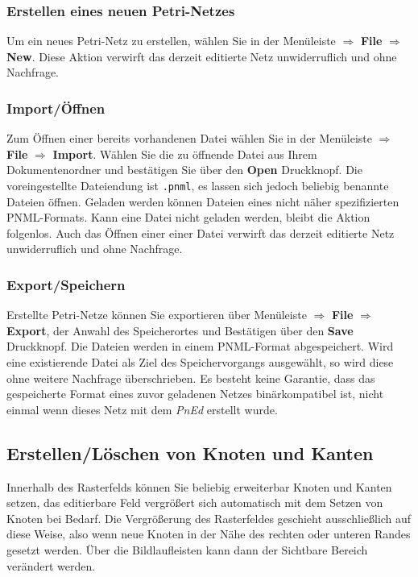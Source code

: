 \documentclass[11pt]{article}
\begin{document}
\subsubsection{Erstellen eines neuen Petri-Netzes}
\label{sec-2-1-1}

    Um ein neues Petri-Netz zu erstellen, wählen Sie in der Menüleiste
    $\Rightarrow$ \textbf{File} $\Rightarrow$ \textbf{New}.  Diese Aktion verwirft das
    derzeit editierte Netz unwiderruflich und ohne Nachfrage.
\subsubsection{Import/Öffnen}
\label{sec-2-1-2}

    Zum Öffnen einer bereits vorhandenen Datei wählen Sie in der
    Menüleiste $\Rightarrow$ \textbf{File} $\Rightarrow$ \textbf{Import}. Wählen Sie die
    zu öffnende Datei aus Ihrem Dokumentenordner und bestätigen Sie
    über den \textbf{Open} Druckknopf.  Die voreingestellte Dateiendung ist
    \verb|.pnml|, es lassen sich jedoch beliebig benannte Dateien
    öffnen.  Geladen werden können Dateien eines nicht näher
    spezifizierten PNML-Formats.  Kann eine Datei nicht geladen
    werden, bleibt die Aktion folgenlos.  Auch das Öffnen einer einer
    Datei verwirft das derzeit editierte Netz unwiderruflich und ohne
    Nachfrage.
\subsubsection{Export/Speichern}
\label{sec-2-1-3}

    Erstellte Petri-Netze können Sie exportieren über Menüleiste
    $\Rightarrow$ \textbf{File} $\Rightarrow$ \textbf{Export}, der Anwahl des
    Speicherortes und Bestätigen über den \textbf{Save} Druckknopf. Die
    Dateien werden in einem PNML-Format abgespeichert.  Wird eine
    existierende Datei als Ziel des Speichervorgangs ausgewählt, so
    wird diese ohne weitere Nachfrage überschrieben.  Es besteht keine
    Garantie, dass das gespeicherte Format eines zuvor geladenen
    Netzes binärkompatibel ist, nicht einmal wenn dieses Netz mit dem
    \emph{PnEd} erstellt wurde.
\subsection{Erstellen/Löschen von Knoten und Kanten}
\label{sec-2-2}


   Innerhalb des Rasterfelds können Sie beliebig erweiterbar Knoten
   und Kanten setzen, das editierbare Feld vergrößert sich automatisch
   mit dem Setzen von Knoten bei Bedarf. Die Vergrößerung des
   Rasterfeldes geschieht ausschließlich auf diese Weise, also wenn
   neue Knoten in der Nähe des rechten oder unteren Randes gesetzt
   werden.  Über die Bildlaufleisten kann dann der Sichtbare Bereich
   verändert werden.
\end{document}
